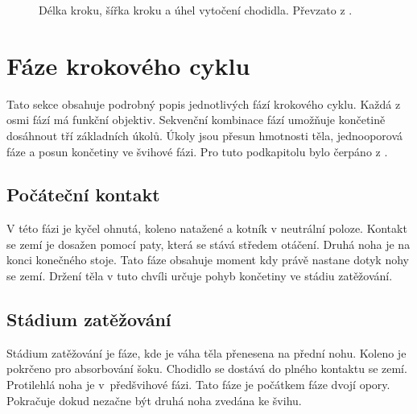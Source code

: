 \begin{figure}[h]
\begin{center}
\caption{Délka kroku, šířka kroku a úhel vytočení chodidla. Převzato z \cite{gait_review}.} \label{step_length}
\end{center}
\end{figure}

\section{Fáze krokového cyklu}
Tato sekce obsahuje podrobný popis jednotlivých fází krokového cyklu. Každá z osmi fází má funkční objektiv. Sekvenční kombinace fází umožňuje končetině dosáhnout tří základních úkolů. Úkoly jsou přesun hmotnosti těla, jednooporová fáze a posun končetiny ve švihové fázi. Pro tuto podkapitolu bylo čerpáno z \cite{gait_review}. 
\subsection{Počáteční kontakt}
V této fázi je kyčel ohnutá, koleno natažené a kotník v neutrální poloze. Kontakt se zemí je dosažen pomocí paty, která se stává středem otáčení. Druhá noha je na konci konečného stoje. Tato fáze obsahuje moment kdy právě nastane dotyk nohy se zemí. Držení těla v tuto chvíli určuje pohyb končetiny ve stádiu zatěžování. 
\subsection{Stádium zatěžování}
Stádium zatěžování je fáze, kde je váha těla přenesena na přední nohu. Koleno je pokrčeno pro absorbování šoku. Chodidlo se dostává do plného kontaktu se zemí. Protilehlá noha je v~předšvihové fázi. Tato fáze je počátkem fáze dvojí opory. Pokračuje dokud nezačne být druhá noha zvedána ke švihu. 
